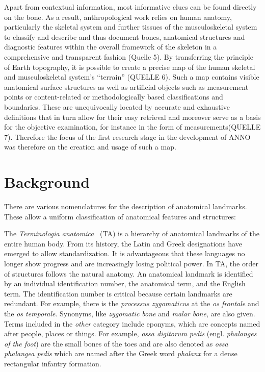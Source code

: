 \documentclass[sw]{iosart2x}
\begin{document}
Apart from contextual information, most informative clues can be found directly on the bone.
As a result, anthropological work relies on human anatomy, particularly the skeletal system and further tissues of the musculoskeletal system to classify and describe and thus document bones, anatomical structures and diagnostic features within the overall framework of the skeleton in a comprehensive and transparent fashion (Quelle 5).
By transferring the principle of Earth topography, it is possible to create a precise map of the human skeletal and musculoskeletal system's \enquote{terrain} (QUELLE 6).
Such a map contains visible anatomical surface structures as well as artificial objects such as measurement points or content-related or methodologically based classifications and boundaries.
These are unequivocally located by accurate and exhaustive definitions that in turn allow for their easy retrieval and moreover serve as a basis for the objective examination, for instance in the form of measurements(QUELLE 7).
Therefore the focus of the first research stage in the development of ANNO was therefore on the creation and usage of such a map.

\section{Background}
There are various nomenclatures for the description of anatomical landmarks.
These allow a uniform classification of anatomical features and structures:

The \emph{Terminologia anatomica}~\citep{ta2} (TA) is a hierarchy of anatomical landmarks of the entire human body.
From its history, the Latin and Greek designations have emerged to allow standardization.
It is advantageous that these languages no longer show progress and are increasingly losing political power.
In TA, the order of structures follows the natural anatomy.
An anatomical landmark is identified by an individual identification number, the anatomical term, and the English term.
The identification number is critical because certain landmarks are redundant.
For example, there is the \emph{processus zygomaticus} at the \emph{os frontale} and the \emph{os temporale}.
Synonyms, like \emph{zygomatic bone} and \emph{malar bone}, are also given.
Terms included in the \emph{other} category include eponyms, which are concepts named after people, places or things.
For example, \emph{ossa digitorum pedis} (engl. \emph{phalanges of the foot}) are the small bones of the toes and are also denoted as \emph{ossa phalangea pedis} which are named after the Greek word \emph{phalanx} for a dense rectangular infantry formation.
\end{document}
